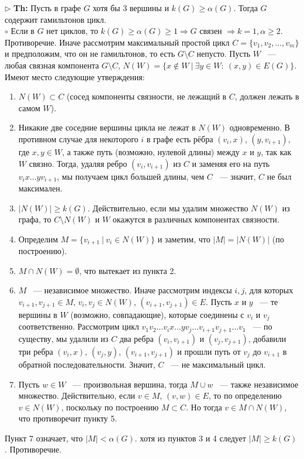 \documentclass[a4paper]{article}
\begin{document}
$\triangleright$ \textbf{Th:}  Пусть в графе $G$ хотя бы 3 вершины и $k(G)\geq\alpha(G)$. Тогда $G$ содержит гамильтонов цикл.
\\
$\circ$  Если в $G$ нет циклов, то $k(G)\geq\alpha(G)\geq 1 \Rightarrow G$ связен $\Rightarrow k=1, \alpha\geq 2$. Противоречие. Иначе рассмотрим максимальный простой цикл $C = \{v_1,v_2,\dots,v_m\}$ и предположим, что он не гамильтонов, то есть $G\setminus C$ непусто. Пусть $W$ ~--- любая связная компонента $G\setminus C$, $N(W) = \{x\notin W\: |\:\exists y \in W: \: (x,y)\in E(G)\}$. Имеют место следующие утверждения:
\begin{enumerate}
\item $N(W)\subset C$ (сосед компоненты связности, не лежащий в $C$, должен лежать в самом $W$). 
\item Никакие две соседние вершины цикла не лежат в $N(W)$ одновременно. В противном случае для некоторого $i$ в графе есть рёбра $(v_i,x)$, $(y,v_{i+1})$, где $x,y \in W$, а также путь (возможно, нулевой длины) между $x$ и $y$, так как $W$ связно. Тогда, удаляя ребро $(v_i,v_{i+1})$ из $C$ и заменяя его на путь $v_ix\dots yv_{i+1}$, мы получаем цикл большей длины, чем $C$ ~--- значит, $C$ не был максимален.
\item $|N(W)|\geq k(G)$. Действительно, если мы удалим множество $N(W)$ из графа, то $C\setminus N(W)$ и $W$ окажутся в различных компонентах связности.
\item Определим $M = \{v_{i+1}\:|\: v_i\in N(W)\}$ и заметим, что $|M|=|N(W)|$ (по построению).
\item $M \cap N(W) = \emptyset$, что вытекает из пункта 2.
\item $M$ ~--- независимое множество. Иначе рассмотрим индексы $i,j$, для которых $v_{i+1},v_{j+1}\in M$, $v_i,v_j\in N(W)$, $(v_{i+1},v_{j+1})\in E$. Пусть $x$ и $y$ ~--- те вершины в $W$ (возможно, совпадающие), которые соединены с $v_i$ и $v_j$ соответственно. Рассмотрим цикл $v_1v_2\dots v_i x\dots y v_j \dots v_{i+1}v_{j+1}\dots v_1$ ~--- по существу, мы удалили из $C$ два ребра $(v_i,v_{i+1})$ и $(v_j,v_{j+1})$, добавили три ребра $(v_i,x)$, $(v_j,y)$, $(v_{i+1},v_{j+1})$ и прошли путь от $v_j$ до $v_{i+1}$ в обратной последовательности. Значит, $C$ ~--- не максимальный цикл.
\item Пусть $w\in W$ ~--- произвольная вершина, тогда $M\cup w$ ~--- также независимое множество. Действительно, если $v\in M$, $(v,w)\in E$, то по определению $v\in N(W)$, поскольку по построению $M\subset C$. Но тогда $v\in M\cap N(W)$, что противоречит пункту 5.
\end{enumerate}
Пункт 7 означает, что $|M|<\alpha(G)$. хотя из пунктов 3 и 4 следует $|M|\geq k(G)$. Противоречие.
\end{document}

